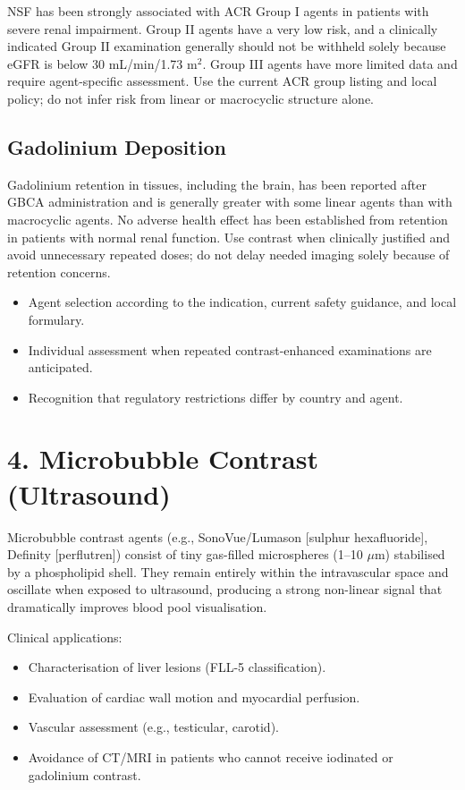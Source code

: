 \begin{warnbox}
NSF has been strongly associated with ACR Group I agents in patients with severe renal impairment. Group II agents have a very low risk, and a clinically indicated Group II examination generally should not be withheld solely because eGFR is below 30 mL/min/1.73 m$^2$. Group III agents have more limited data and require agent-specific assessment. Use the current ACR group listing and local policy; do not infer risk from linear or macrocyclic structure alone.
\end{warnbox}

\subsection*{Gadolinium Deposition}
Gadolinium retention in tissues, including the brain, has been reported after GBCA administration and is generally greater with some linear agents than with macrocyclic agents. No adverse health effect has been established from retention in patients with normal renal function. Use contrast when clinically justified and avoid unnecessary repeated doses; do not delay needed imaging solely because of retention concerns.
\begin{itemize}
    \item Agent selection according to the indication, current safety guidance, and local formulary.
    \item Individual assessment when repeated contrast-enhanced examinations are anticipated.
    \item Recognition that regulatory restrictions differ by country and agent.
\end{itemize}


\section*{4. Microbubble Contrast (Ultrasound)}
Microbubble contrast agents (e.g., SonoVue/Lumason [sulphur hexafluoride], Definity [perflutren]) consist of tiny gas-filled microspheres (1--10 $\mu$m) stabilised by a phospholipid shell. They remain entirely within the intravascular space and oscillate when exposed to ultrasound, producing a strong non-linear signal that dramatically improves blood pool visualisation.

Clinical applications:
\begin{itemize}
    \item Characterisation of liver lesions (FLL-5 classification).
    \item Evaluation of cardiac wall motion and myocardial perfusion.
    \item Vascular assessment (e.g., testicular, carotid).
    \item Avoidance of CT/MRI in patients who cannot receive iodinated or gadolinium contrast.
\end{itemize}

